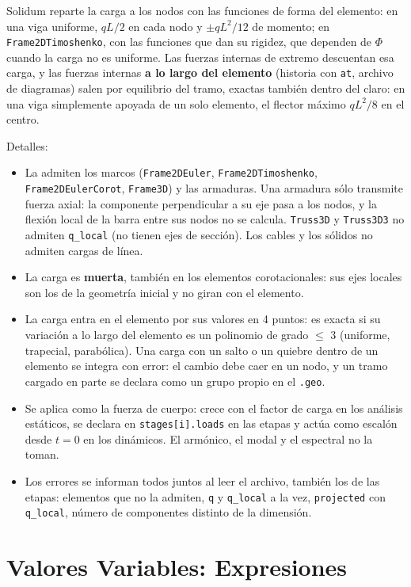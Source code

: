 \documentclass[11pt,oneside]{report}
\begin{document}
Solidum reparte la carga a los nodos con las funciones de forma del elemento: en una viga uniforme, $qL/2$ en cada nodo y $\pm qL^2/12$ de momento; en \texttt{Frame2DTimoshenko}, con las funciones que dan su rigidez, que dependen de $\Phi$ cuando la carga no es uniforme. Las fuerzas internas de extremo descuentan esa carga, y las fuerzas internas \textbf{a lo largo del elemento} (historia con \texttt{at}, archivo de diagramas) salen por equilibrio del tramo, exactas también dentro del claro: en una viga simplemente apoyada de un solo elemento, el flector máximo $qL^2/8$ en el centro.

Detalles:

\begin{itemize}
  \item La admiten los marcos (\texttt{Frame2DEuler}, \texttt{Frame2DTimoshenko}, \texttt{Frame2DEulerCorot}, \texttt{Frame3D}) y las armaduras. Una armadura sólo transmite fuerza axial: la componente perpendicular a su eje pasa a los nodos, y la flexión local de la barra entre sus nodos no se calcula. \texttt{Truss3D} y \texttt{Truss3D3} no admiten \texttt{q\_local} (no tienen ejes de sección). Los cables y los sólidos no admiten cargas de línea.
  \item La carga es \textbf{muerta}, también en los elementos corotacionales: sus ejes locales son los de la geometría inicial y no giran con el elemento.
  \item La carga entra en el elemento por sus valores en 4 puntos: es exacta si su variación a lo largo del elemento es un polinomio de grado \ensuremath{\le} 3 (uniforme, trapecial, parabólica). Una carga con un salto o un quiebre dentro de un elemento se integra con error: el cambio debe caer en un nodo, y un tramo cargado en parte se declara como un grupo propio en el \texttt{.geo}.
  \item Se aplica como la fuerza de cuerpo: crece con el factor de carga en los análisis estáticos, se declara en \texttt{stages[i].loads} en las etapas y actúa como escalón desde $t = 0$ en los dinámicos. El armónico, el modal y el espectral no la toman.
  \item Los errores se informan todos juntos al leer el archivo, también los de las etapas: elementos que no la admiten, \texttt{q} y \texttt{q\_local} a la vez, \texttt{projected} con \texttt{q\_local}, número de componentes distinto de la dimensión.
\end{itemize}

\section{Valores Variables: Expresiones}
\end{document}

